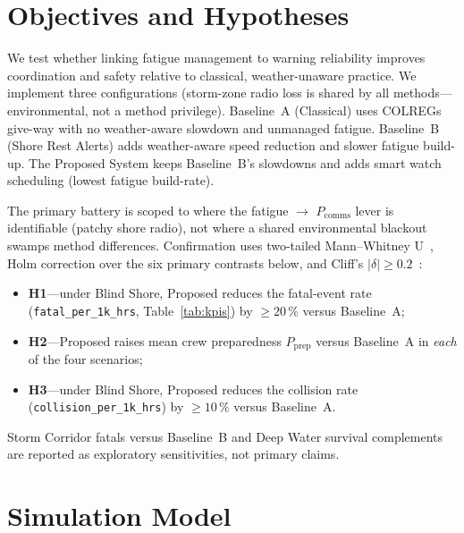 \documentclass[cameraready]{Interspeech}
\begin{document}
\section{Objectives and Hypotheses}
\label{sec:goal}

We test whether linking fatigue management to warning reliability improves coordination and safety relative to classical, weather-unaware practice. We implement three configurations (storm-zone radio loss is shared by all methods---environmental, not a method privilege). Baseline~A (Classical) uses COLREGs give-way with no weather-aware slowdown and unmanaged fatigue. Baseline~B (Shore Rest Alerts) adds weather-aware speed reduction and slower fatigue build-up. The Proposed System keeps Baseline~B's slowdowns and adds smart watch scheduling (lowest fatigue build-rate).

The primary battery is scoped to where the fatigue $\to$ $P_{\text{comms}}$ lever is identifiable (patchy shore radio), not where a shared environmental blackout swamps method differences. Confirmation uses two-tailed Mann--Whitney U~\cite{mannwhitney1947}, Holm correction over the six primary contrasts below, and Cliff's $|\delta|\ge0.2$~\cite{cliff1993}:
\begin{itemize}
  \item \textbf{H1}---under Blind Shore, Proposed reduces the fatal-event rate (\texttt{fatal\_per\_1k\_hrs}, Table~\ref{tab:kpis}) by ${\geq}20\,\%$ versus Baseline~A;
  \item \textbf{H2}---Proposed raises mean crew preparedness $P_{\text{prep}}$ versus Baseline~A in \emph{each} of the four scenarios;
  \item \textbf{H3}---under Blind Shore, Proposed reduces the collision rate (\texttt{collision\_per\_1k\_hrs}) by ${\geq}10\,\%$ versus Baseline~A.
\end{itemize}
Storm Corridor fatals versus Baseline~B and Deep Water survival complements are reported as exploratory sensitivities, not primary claims.

\section{Simulation Model}
\label{sec:model}
\end{document}
